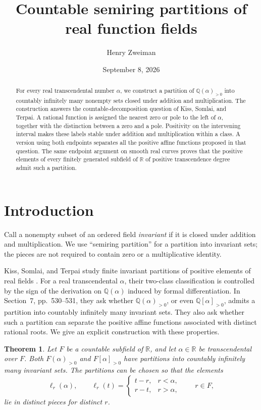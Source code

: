 \documentclass[11pt]{article}
\title{Countable semiring partitions of real function fields}
\author{Henry Zweiman}
\date{September 8, 2026}
\newtheorem{theorem}{Theorem}
\theoremstyle{remark}
\newcommand{\Q}{\mathbb Q}
\newcommand{\R}{\mathbb R}
\begin{document}
\maketitle
\begin{abstract}
For every real transcendental number $\alpha$, we construct a partition of $\Q(\alpha)_{>0}$ into countably infinitely many nonempty sets closed under addition and multiplication. The construction answers the countable-decomposition question of Kiss, Somlai, and Terpai. A rational function is assigned the nearest zero or pole to the left of $\alpha$, together with the distinction between a zero and a pole. Positivity on the intervening interval makes these labels stable under addition and multiplication within a class. A version using both endpoints separates all the positive affine functions proposed in that question. The same endpoint argument on smooth real curves proves that the positive elements of every finitely generated subfield of $\R$ of positive transcendence degree admit such a partition.
\end{abstract}

\section{Introduction}
Call a nonempty subset of an ordered field \emph{invariant} if it is closed under addition and multiplication. We use ``semiring partition'' for a partition into invariant sets; the pieces are not required to contain zero or a multiplicative identity.

Kiss, Somlai, and Terpai study finite invariant partitions of positive elements of real fields \cite{KST}. For a real transcendental $\alpha$, their two-class classification is controlled by the sign of the derivation on $\Q(\alpha)$ induced by formal differentiation. In Section~7, pp.~530--531, they ask whether $\Q(\alpha)_{>0}$, or even $\Q[\alpha]_{>0}$, admits a partition into countably infinitely many invariant sets. They also ask whether such a partition can separate the positive affine functions associated with distinct rational roots. We give an explicit construction with these properties.

\begin{theorem}\label{thm:main}
Let $F$ be a countable subfield of $\R$, and let $\alpha\in\R$ be transcendental over $F$. Both $F(\alpha)_{>0}$ and $F[\alpha]_{>0}$ have partitions into countably infinitely many invariant sets. The partitions can be chosen so that the elements
\[
 \ell_r(\alpha),\qquad
 \ell_r(t)=\begin{cases}t-r,&r<\alpha,\\r-t,&r>\alpha,\end{cases}
 \qquad r\in F,
\]
lie in distinct pieces for distinct $r$.
\end{theorem}
\end{document}

